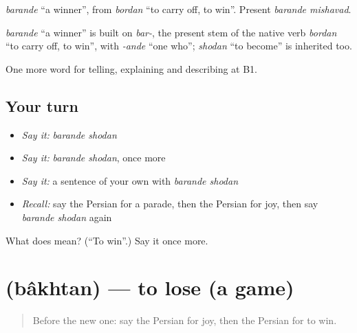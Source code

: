 \emph{barande} \textquotedblleft{}a winner\textquotedblright{}, from \emph{bordan} \textquotedblleft{}to carry off, to win\textquotedblright{}. Present \emph{barande mishavad}.

\begin{cousinweb}
\emph{barande} \textquotedblleft{}a winner\textquotedblright{} is built on \emph{bar-}, the present stem of the native verb \emph{bordan} \textquotedblleft{}to carry off, to win\textquotedblright{}, with \emph{-ande} \textquotedblleft{}one who\textquotedblright{}; \emph{shodan} \textquotedblleft{}to become\textquotedblright{} is inherited too.
\end{cousinweb}

\begin{grammarlens}[title={What you've built}]
One more word for telling, explaining and describing at B1.
\end{grammarlens}

\subsection*{Your turn}
\begin{itemize}
\raggedright
  \item \emph{Say it:} \emph{barande shodan}
  \item \emph{Say it:} \emph{barande shodan}, once more
  \item \emph{Say it:} a sentence of your own with \emph{barande shodan}
  \item \emph{Recall:} say the Persian for a parade, then the Persian for joy, then say \emph{barande shodan} again
\end{itemize}

\begin{tcolorbox}[breakable,colback=teal!4,colframe=teal!35!black,title={Before you move on}]
What does   mean? (\textquotedblleft{}To win\textquotedblright{}.) Say it once more.
\end{tcolorbox}
\section[\texorpdfstring{\fa{باختن} (bâkhtan)}{باختن (bâkhtan)}]{ (bâkhtan) — to lose (a game)}

\label{lesson:FA-C343-bakhtan}



\begin{quote}
Before the new one: say the Persian for joy, then the Persian for to win.
\end{quote}

